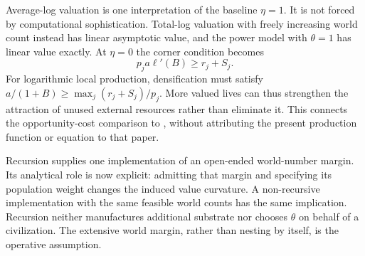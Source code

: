 Average-log valuation is one interpretation of the baseline $\eta=1$.
It is not forced by computational sophistication. Total-log valuation
with freely increasing world count instead has linear asymptotic value,
and the power model with $\theta=1$ has linear value exactly. At
$\eta=0$ the corner condition becomes
\begin{equation}
 p_ja\ell'(B)\geq r_j+S_j.
 \label{eq:totalist-corner}
\end{equation}
For logarithmic local production, densification must satisfy
$a/(1+B)\geq\max_j(r_j+S_j)/p_j$. More valued lives can thus strengthen
the attraction of unused external resources rather than eliminate it.
This connects the opportunity-cost comparison to
\citet{Bostrom2003Waste}, without attributing the present production
function or equation to that paper.

Recursion supplies one implementation of an open-ended world-number
margin. Its analytical role is now explicit: admitting that margin and
specifying its population weight changes the induced value curvature.
A non-recursive implementation with the same feasible world counts has
the same implication. Recursion neither manufactures additional substrate
nor chooses $\theta$ on behalf of a civilization. The extensive world
margin, rather than nesting by itself, is the operative assumption.
